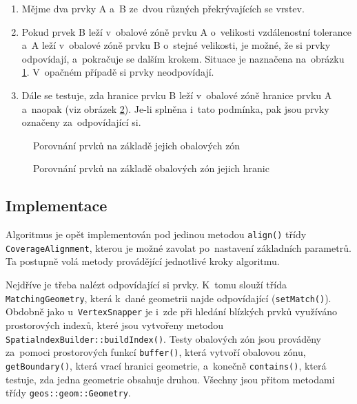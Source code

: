 \begin{enumerate}
 \item Mějme dva prvky A a~B ze~dvou různých překrývajících se vrstev.
 \item Pokud prvek B leží v~obalové zóně prvku A o~velikosti vzdálenostní 
    tolerance a~A leží v~obalové zóně prvku B o~stejné velikosti, je možné, 
    že si prvky odpovídají, a~pokračuje se dalším krokem. Situace je naznačena
    na~obrázku \ref{fig:buffer}. V~opačném případě si prvky neodpovídají.
 \item Dále se testuje, zda hranice prvku B leží v~obalové zóně hranice prvku
    A a~naopak (viz obrázek \ref{fig:buffer-boundary}). Je-li splněna i~tato 
    podmínka, pak jsou prvky označeny za~odpovídající si.
\end{enumerate}

  \begin{figure}[ht]
    \centering
      \small
      \def\svgwidth{390pt}
      
      \caption{Porovnání prvků na základě jejich obalových zón}
      \label{fig:buffer}
  \end{figure}

  \begin{figure}[ht]
    \centering
      \small
      \def\svgwidth{400pt}
      
      \caption{Porovnání prvků na základě obalových zón jejich hranic}
      \label{fig:buffer-boundary}
  \end{figure}

\subsection{Implementace}
\label{ca-implementace}
Algoritmus je opět implementován pod jedinou metodou \texttt{align()} 
třídy \texttt{Coverage\-Alignment}, kterou je možné zavolat po~nastavení
základních parametrů. Ta po\-stupně volá metody provádějící jednotlivé
kroky algoritmu.

Nejdříve je třeba nalézt odpovídající si prvky. K~tomu slouží třída 
\texttt{Matching\-Geometry}, která k~dané geometrii najde odpovídající
(\texttt{set\-Match()}). Obdobně jako u~\texttt{Vertex\-Snapper} je i~zde 
při hledání blízkých prvků využíváno prostorových indexů, které jsou 
vytvořeny metodou \texttt{SpatialndexBuilder::build\-Index()}. Testy
obalových zón jsou prováděny za~pomoci prostorových funkcí 
\texttt{buffer()}, která vytvoří obalovou zónu, \texttt{getBoundary()},
která vrací hranici geometrie, a~konečně \texttt{contains()}, která
testuje, zda jedna geometrie obsahuje druhou. Všechny jsou přitom
metodami třídy \texttt{geos::geom::Geometry}.

